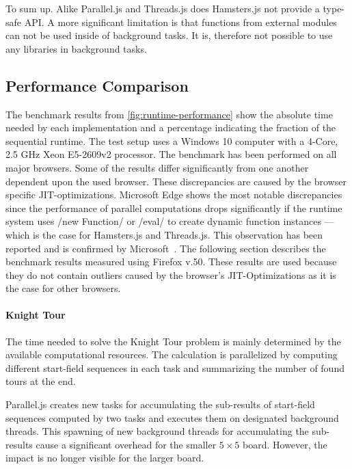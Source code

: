 To sum up. Alike Parallel.js and Threads.js does Hamsters.js not provide a type-safe API. A more significant limitation is that functions from external modules can not be used inside of background tasks. It is, therefore not possible to use any libraries in background tasks. 

\subsection{Performance Comparison}
The benchmark results from \cref{fig:runtime-performance} show the absolute time needed by each implementation and a percentage indicating the fraction of the sequential runtime. The test setup uses a Windows 10 computer with a 4-Core, 2.5 GHz Xeon E5-2609v2 processor. The benchmark has been performed on all major browsers. Some of the results differ significantly from one another dependent upon the used browser. These discrepancies are caused by the browser specific JIT-optimizations. Microsoft Edge shows the most notable discrepancies since the performance of parallel computations drops significantly if the runtime system uses \javascriptinline/new Function/ or \javascriptinline/eval/ to create dynamic function instances --- which is the case for Hamsters.js and Threads.js. This observation has been reported and is confirmed by Microsoft~\cite{newFunctionWebWorkerEdge}. The following section describes the benchmark results measured using Firefox v.50. These results are used because they do not contain outliers caused by the browser's JIT-Optimizations as it is the case for other browsers.

\begin{figure*}
		
	\caption{Runtime Performance of Parallelization Problems Relative to Sequential Execution}
	\label{fig:runtime-performance}
\end{figure*}


\paragraph{Knight Tour} The time needed to solve the Knight Tour problem is mainly determined by the available computational resources. The calculation is parallelized by computing different start-field sequences in each task and summarizing the number of found tours at the end. 

Parallel.js creates new tasks for accumulating the sub-results of start-field sequences computed by two tasks and executes them on designated background threads. This spawning of new background threads for accumulating the sub-results cause a significant overhead for the smaller $5\times5$ board. However, the impact is no longer visible for the larger board.

